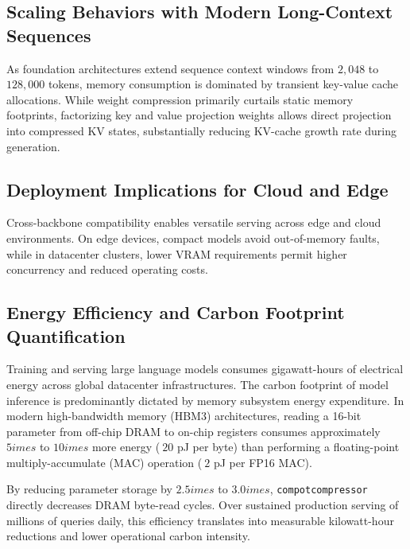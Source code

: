 \subsection{Scaling Behaviors with Modern Long-Context Sequences}
As foundation architectures extend sequence context windows from $2{,}048$ to $128{,}000$ tokens, memory consumption is dominated by transient key-value cache allocations. While weight compression primarily curtails static memory footprints, factorizing key and value projection weights allows direct projection into compressed KV states, substantially reducing KV-cache growth rate during generation.

\subsection{Deployment Implications for Cloud and Edge}
Cross-backbone compatibility enables versatile serving across edge and cloud environments. On edge devices, compact models avoid out-of-memory faults, while in datacenter clusters, lower VRAM requirements permit higher concurrency and reduced operating costs.

\subsection{Energy Efficiency and Carbon Footprint Quantification}
Training and serving large language models consumes gigawatt-hours of electrical energy across global datacenter infrastructures. The carbon footprint of model inference is predominantly dictated by memory subsystem energy expenditure. In modern high-bandwidth memory (HBM3) architectures, reading a 16-bit parameter from off-chip DRAM to on-chip registers consumes approximately $5	imes$ to $10	imes$ more energy ($~20$ pJ per byte) than performing a floating-point multiply-accumulate (MAC) operation ($~2$ pJ per FP16 MAC).

By reducing parameter storage by $2.5	imes$ to $3.0	imes$, \texttt{compotcompressor} directly decreases DRAM byte-read cycles. Over sustained production serving of millions of queries daily, this efficiency translates into measurable kilowatt-hour reductions and lower operational carbon intensity.
